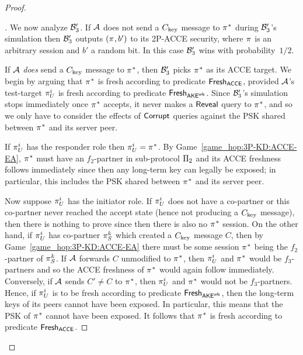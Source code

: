 \begin{proof}
\begin{proof}[]
\medskip
We now analyze $\A[B]'_3$.
If $\A$ does not send a $\Ckey$ message to $\oracle^*$ during $\A[B]'_3$'s simulation
then $\A[B]'_3$ outputs $(\oracle, b')$ to its 2P-ACCE security,
where $\oracle$ is an arbitrary session and $b'$ a random bit.
In this case $\A[B]'_3$ wins with probability~$1/2$.

If $\A$ \emph{does} send a $\Ckey$ message to $\oracle^*$,
then $\A[B]'_3$ picks $\oracle^*$ as its ACCE target.
We begin by arguing that $\oracle^*$ is fresh according to predicate $\fresh_{\acce}$,
provided $\A$'s test-target $\oracle[U][i]$ is fresh according to predicate $\fresh_{\akewfs}$.
Since $\A[B]'_3$'s simulation stops immediately once $\oracle^*$ accepts,
it never makes a $\Reveal$ query to $\oracle^*$,
and so we only have to consider the effects of $\Corrupt$ queries against the PSK shared between $\oracle^*$ and its server peer. 


If $\oracle[U][i]$ has the responder role then $\oracle[U][i] = \oracle^*$.
By Game~\ref{game_hop:3P-KD:ACCE-EA},
$\oracle^*$ must have an $f_2$-partner in sub-protocol $\protocol_2$ and its ACCE freshness follows immediately
since then any long-term key can legally be exposed;
in particular,
this includes the PSK shared between $\oracle^*$ and its server peer.

Now suppose $\oracle[U][i]$ has the initiator role.
If $\oracle[U][i]$ does not have a co-partner or this co-partner never reached the accept state
(hence not producing a $\Ckey$ message),
then there is nothing to prove since then there is also no $\oracle^*$ session.
On the other hand,
if $\oracle[U][i]$ has co-partner $\oracle[S][k]$ which created a $\Ckey$ message $C$,
then by Game~\ref{game_hop:3P-KD:ACCE-EA} there must be some session $\oracle^*$ being the $f_2$-partner of $\oracle[S][k]$.
If $\A$ forwards $C$ unmodified to $\oracle^*$,
then $\oracle[U][i]$ and $\oracle^*$ would be $f_3$-partners and so the ACCE freshness of $\oracle^*$ would again follow immediately.
Conversely,
if $\A$ sends $C' \neq C$ to $\oracle^*$,
then $\oracle[U][i]$ and $\oracle^*$ would not be $f_3$-partners.
Hence,
if $\oracle[U][i]$ is to be fresh according to predicate $\fresh_{\akewfs}$,
then the long-term keys of its peers cannot have been exposed.
In particular,
this means that the PSK of $\oracle^*$ cannot have been exposed.
It follows that $\oracle^*$ is fresh according to predicate $\fresh_{\acce}$. 


\end{proof}
\end{proof}

